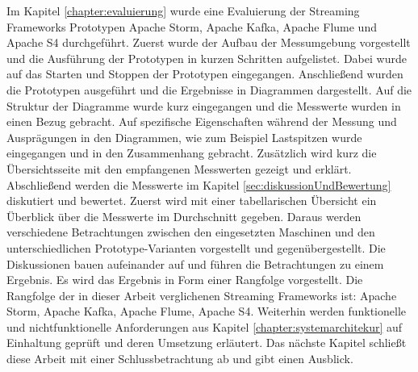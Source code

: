 Im Kapitel \ref{chapter:evaluierung} wurde eine Evaluierung der Streaming Frameworks Prototypen Apache Storm, Apache Kafka, Apache Flume und Apache S4 durchgeführt. Zuerst wurde der Aufbau der Messumgebung vorgestellt und die Ausführung der Prototypen in kurzen Schritten aufgelistet. Dabei wurde auf das Starten und Stoppen der Prototypen eingegangen. Anschließend wurden die Prototypen ausgeführt und die Ergebnisse in Diagrammen dargestellt. Auf die Struktur der Diagramme wurde kurz eingegangen und die Messwerte wurden in einen Bezug gebracht. Auf spezifische Eigenschaften während der Messung und Ausprägungen in den Diagrammen, wie zum Beispiel Lastspitzen wurde eingegangen und in den Zusammenhang gebracht. Zusätzlich wird kurz die Übersichtsseite mit den empfangenen Messwerten gezeigt und erklärt. Abschließend werden die Messwerte im Kapitel \ref{sec:diskussionUndBewertung} diskutiert und bewertet. Zuerst wird mit einer tabellarischen Übersicht ein Überblick über die Messwerte im Durchschnitt gegeben. Daraus werden verschiedene Betrachtungen zwischen den eingesetzten Maschinen und den unterschiedlichen Prototype-Varianten vorgestellt und gegenübergestellt. Die Diskussionen bauen aufeinander auf und führen die Betrachtungen zu einem Ergebnis. Es wird das Ergebnis in Form einer Rangfolge vorgestellt. Die Rangfolge der in dieser Arbeit verglichenen Streaming Frameworks ist: Apache Storm, Apache Kafka, Apache Flume, Apache S4. Weiterhin werden funktionelle und nichtfunktionelle Anforderungen aus Kapitel \ref{chapter:systemarchitekur} auf Einhaltung geprüft und deren Umsetzung erläutert. Das nächste Kapitel schließt diese Arbeit mit einer Schlussbetrachtung ab und gibt einen Ausblick.